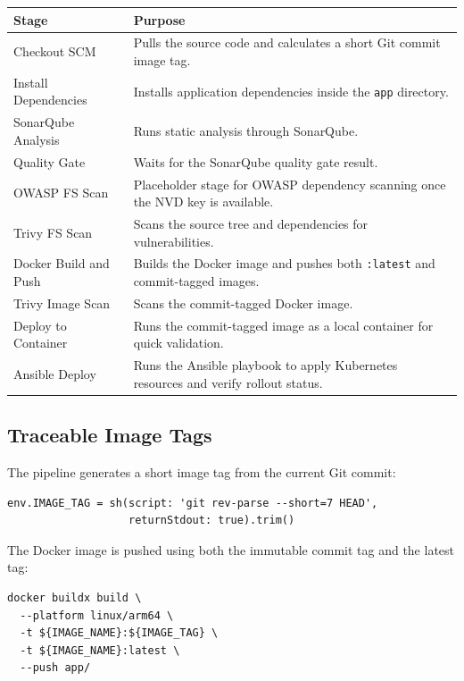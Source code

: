 \documentclass[12pt,a4paper]{article}
\begin{document}
\begin{longtable}{>{\raggedright\arraybackslash}p{4cm} >{\raggedright\arraybackslash}p{9cm}}
\toprule
\textbf{Stage} & \textbf{Purpose} \\
\midrule
Checkout SCM & Pulls the source code and calculates a short Git commit image tag. \\
Install Dependencies & Installs application dependencies inside the \texttt{app} directory. \\
SonarQube Analysis & Runs static analysis through SonarQube. \\
Quality Gate & Waits for the SonarQube quality gate result. \\
OWASP FS Scan & Placeholder stage for OWASP dependency scanning once the NVD key is available. \\
Trivy FS Scan & Scans the source tree and dependencies for vulnerabilities. \\
Docker Build and Push & Builds the Docker image and pushes both \texttt{:latest} and commit-tagged images. \\
Trivy Image Scan & Scans the commit-tagged Docker image. \\
Deploy to Container & Runs the commit-tagged image as a local container for quick validation. \\
Ansible Deploy & Runs the Ansible playbook to apply Kubernetes resources and verify rollout status. \\
\bottomrule
\end{longtable}

\subsection{Traceable Image Tags}

The pipeline generates a short image tag from the current Git commit:

\begin{lstlisting}[style=projectcode]
env.IMAGE_TAG = sh(script: 'git rev-parse --short=7 HEAD',
                   returnStdout: true).trim()
\end{lstlisting}

The Docker image is pushed using both the immutable commit tag and the latest
tag:

\begin{lstlisting}[style=projectcode]
docker buildx build \
  --platform linux/arm64 \
  -t ${IMAGE_NAME}:${IMAGE_TAG} \
  -t ${IMAGE_NAME}:latest \
  --push app/
\end{lstlisting}
\end{document}
